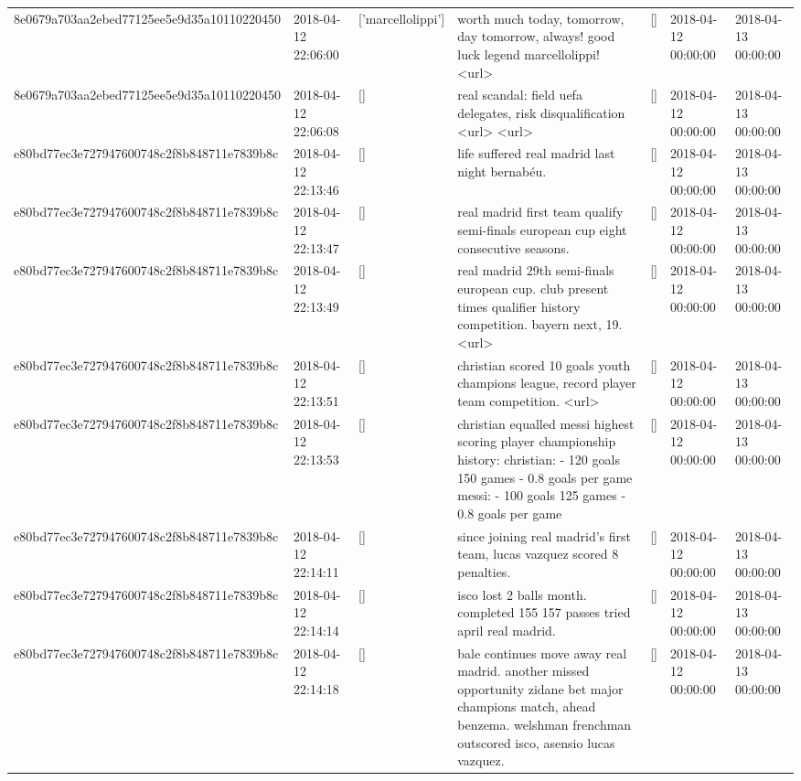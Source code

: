 \begin{tabular}{lllllll}
8e0679a703aa2ebed77125ee5e9d35a10110220450 & 2018-04-12 22:06:00 & ['marcellolippi'] & worth much today, tomorrow, day tomorrow, always! good luck legend marcellolippi! ️️ <url> & [] & 2018-04-12 00:00:00 & 2018-04-13 00:00:00 \\
8e0679a703aa2ebed77125ee5e9d35a10110220450 & 2018-04-12 22:06:08 & [] & real scandal: field uefa delegates, risk disqualification <url> <url> & [] & 2018-04-12 00:00:00 & 2018-04-13 00:00:00 \\
e80bd77ec3e727947600748c2f8b848711e7839b8c & 2018-04-12 22:13:46 & [] & life suffered real madrid last night bernabéu. & [] & 2018-04-12 00:00:00 & 2018-04-13 00:00:00 \\
e80bd77ec3e727947600748c2f8b848711e7839b8c & 2018-04-12 22:13:47 & [] & real madrid first team qualify semi-finals european cup eight consecutive seasons. & [] & 2018-04-12 00:00:00 & 2018-04-13 00:00:00 \\
e80bd77ec3e727947600748c2f8b848711e7839b8c & 2018-04-12 22:13:49 & [] & real madrid 29th semi-finals european cup. club present times qualifier history competition. bayern next, 19. <url> & [] & 2018-04-12 00:00:00 & 2018-04-13 00:00:00 \\
e80bd77ec3e727947600748c2f8b848711e7839b8c & 2018-04-12 22:13:51 & [] & christian scored 10 goals youth champions league, record player team competition. <url> & [] & 2018-04-12 00:00:00 & 2018-04-13 00:00:00 \\
e80bd77ec3e727947600748c2f8b848711e7839b8c & 2018-04-12 22:13:53 & [] & christian equalled messi highest scoring player championship history: christian: - 120 goals 150 games - 0.8 goals per game messi: - 100 goals 125 games - 0.8 goals per game & [] & 2018-04-12 00:00:00 & 2018-04-13 00:00:00 \\
e80bd77ec3e727947600748c2f8b848711e7839b8c & 2018-04-12 22:14:11 & [] & since joining real madrid's first team, lucas vazquez scored 8 penalties. & [] & 2018-04-12 00:00:00 & 2018-04-13 00:00:00 \\
e80bd77ec3e727947600748c2f8b848711e7839b8c & 2018-04-12 22:14:14 & [] & isco lost 2 balls month. completed 155 157 passes tried april real madrid. & [] & 2018-04-12 00:00:00 & 2018-04-13 00:00:00 \\
e80bd77ec3e727947600748c2f8b848711e7839b8c & 2018-04-12 22:14:18 & [] & bale continues move away real madrid. another missed opportunity zidane bet major champions match, ahead benzema. welshman frenchman outscored isco, asensio lucas vazquez. & [] & 2018-04-12 00:00:00 & 2018-04-13 00:00:00 \\

\end{tabular}
